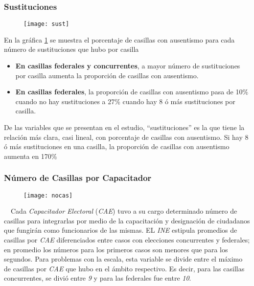 \documentclass[DIV=calc, 
					paper=letter, 
					fontsize=11pt, 
					twocolumn]{scrartcl}
\begin{document}
\subsubsection{Sustituciones}
\vspace{3mm}

\begin{figure}[H]
\caption{}
\centering
\texttt{[image: sust]}
\label{fig:sust}
\end{figure}

En la gr\'afica \ref{fig:sust} se muestra el porcentaje de casillas con ausentismo para cada número de sustituciones que hubo por casilla\\
\begin{itemize}
\item \textbf{En casillas federales y concurrentes}, a mayor número de sustituciones por casilla aumenta la proporción de casillas con ausentismo.\\
\item  \textbf{En casillas federales}, la proporción de casillas con ausentismo pasa de 10\% cuando no hay sustituciones a 27\% cuando hay 8 ó más sustituciones por casilla. \\
\end{itemize}

De las variables que se presentan en el estudio, “sustituciones” es la que tiene la relación más clara, casi lineal, con porcentaje de casillas con ausentismo. Si hay 8 ó más sustituciones en una casilla, la proporción de casillas con ausentismo aumenta en 170\%\\

\subsubsection{N\'umero de Casillas por Capacitador}
\vspace{3mm}

\begin{figure}[H]
\caption{}
\centering\texttt{[image: nocas]}
\label{fig:nocas}
\end{figure}

~~Cada \textit{Capacitador Electoral} (\textit{CAE}) tuvo a su cargo determinado n\'umero de casillas para integrarlas por medio de la capacitaci\'on y designaci\'on de ciudadanos que fungir\'an como funcionarios de las mismas. EL \textit{INE} estipula promedios de casillas por \textit{CAE} diferenciados entre casos con elecciones concurrentes y federales; en promedio los n\'umeros para los primeros casos son menores que para los segundos. Para problemas con la escala, esta variable se divide entre el m\'aximo de casillas por \textit{CAE} que hubo en el \'ambito respectivo. Es decir, para las casillas concurrentes, se divi\'o entre \textit{9} y para las federales fue entre \textit{10}.\\
\end{document}
